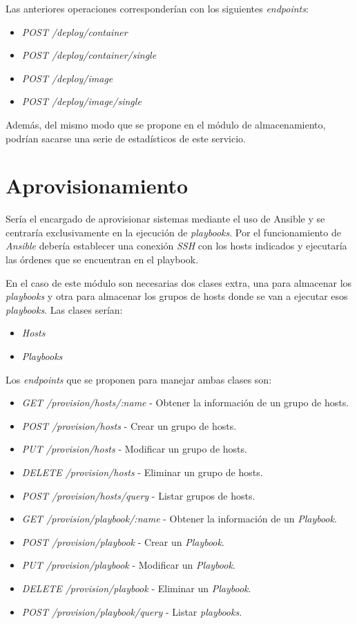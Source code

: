 \bigskip
Las anteriores operaciones corresponderían con los siguientes \textit{endpoints}:
\begin{itemize}
	\item \textit{POST /deploy/container}
	\item \textit{POST /deploy/container/single}
	\item \textit{POST /deploy/image}
	\item \textit{POST /deploy/image/single}
\end{itemize}


\bigskip
Además, del mismo modo que se propone en el módulo de almacenamiento, podrían sacarse una serie de estadísticos de este servicio.





\section{Aprovisionamiento}
Sería el encargado de aprovisionar sistemas mediante el uso de Ansible y se centraría exclusivamente en la ejecución de \textit{playbooks}. Por el funcionamiento de \textit{Ansible} debería establecer una conexión \textit{SSH} con los hosts indicados y ejecutaría las órdenes que se encuentran en el playbook.

En el caso de este módulo son necesarias dos clases extra, una para almacenar los \textit{playbooks} y otra para almacenar los grupos de hosts donde se van a ejecutar esos \textit{playbooks}. Las clases serían:
\begin{itemize}
	\item \textit{Hosts}
	\item \textit{Playbooks}
\end{itemize}


\bigskip
Los \textit{endpoints} que se proponen para manejar ambas clases son:
\begin{itemize}
	\item \textit{GET /provision/hosts/:name} - Obtener la información de un grupo de hosts.
	\item \textit{POST /provision/hosts} - Crear un grupo de hosts.
	\item \textit{PUT /provision/hosts} - Modificar un grupo de hosts.
	\item \textit{DELETE /provision/hosts} - Eliminar un grupo de hosts.
	\item \textit{POST /provision/hosts/query} - Listar grupos de hosts.
	\item \textit{GET /provision/playbook/:name} - Obtener la información de un \textit{Playbook}.
	\item \textit{POST /provision/playbook} - Crear un \textit{Playbook}.
	\item \textit{PUT /provision/playbook} - Modificar un \textit{Playbook}.
	\item \textit{DELETE /provision/playbook} - Eliminar un \textit{Playbook}.
	\item \textit{POST /provision/playbook/query} - Listar \textit{playbooks}.
\end{itemize}

